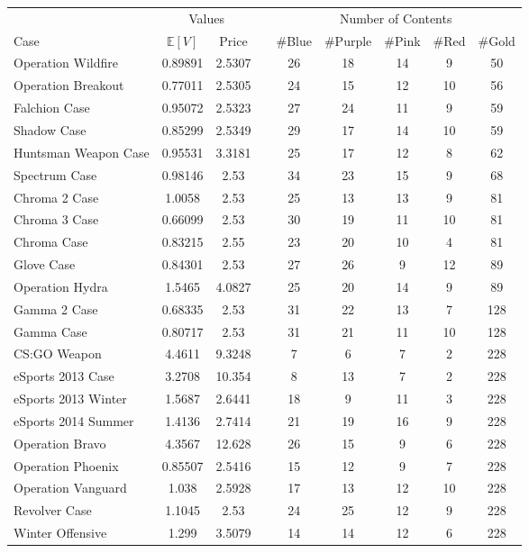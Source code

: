 \documentclass[12pt]{paper}
\begin{document}
\begin{minipage}{\linewidth}
  \centering
  \begin{tabular}{@{}lcccccccc@{}}\toprule
    & \multicolumn{2}{c}{Values} & &\multicolumn{5}{c}{Number of Contents}\\
    \cmidrule{2-3} \cmidrule{5-9}
  Case & $\mathbb{E}[V]$ & Price &\quad& \#Blue & \#Purple & \#Pink & \#Red & \#Gold\\\midrule
Operation Wildfire  & 0.89891 & 2.5307 &\quad& 26 & 18 & 14 & 9 & 50\\
Operation Breakout  & 0.77011 & 2.5305 &\quad& 24 & 15 & 12 & 10 & 56\\
Falchion Case  & 0.95072 & 2.5323 &\quad& 27 & 24 & 11 & 9 & 59\\
Shadow Case  & 0.85299 & 2.5349 &\quad& 29 & 17 & 14 & 10 & 59\\
Huntsman Weapon Case  & 0.95531 & 3.3181 &\quad& 25 & 17 & 12 & 8 & 62\\
Spectrum Case  & 0.98146 & 2.53 &\quad& 34 & 23 & 15 & 9 & 68\\
Chroma 2 Case  & 1.0058 & 2.53 &\quad& 25 & 13 & 13 & 9 & 81\\
Chroma 3 Case  & 0.66099 & 2.53 &\quad& 30 & 19 & 11 & 10 & 81\\
Chroma Case  & 0.83215 & 2.55 &\quad& 23 & 20 & 10 & 4 & 81\\
Glove Case  & 0.84301 & 2.53 &\quad& 27 & 26 & 9 & 12 & 89\\
Operation Hydra  & 1.5465 & 4.0827 &\quad& 25 & 20 & 14 & 9 & 89\\
Gamma 2 Case  & 0.68335 & 2.53 &\quad& 31 & 22 & 13 & 7 & 128\\
Gamma Case & 0.80717 & 2.53 &\quad& 31 & 21 & 11 & 10 & 128\\\hline
CS:GO Weapon  & 4.4611 & 9.3248 &\quad& 7 & 6 & 7 & 2 & 228\\
eSports 2013 Case  & 3.2708 & 10.354 &\quad& 8 & 13 & 7 & 2 & 228\\
eSports 2013 Winter  & 1.5687 & 2.6441 &\quad& 18 & 9 & 11 & 3 & 228\\
eSports 2014 Summer  & 1.4136 & 2.7414 &\quad& 21 & 19 & 16 & 9 & 228\\
Operation Bravo  & 4.3567 & 12.628 &\quad& 26 & 15 & 9 & 6 & 228\\
Operation Phoenix  & 0.85507 & 2.5416 &\quad& 15 & 12 & 9 & 7 & 228\\
Operation Vanguard  & 1.038 & 2.5928 &\quad& 17 & 13 & 12 & 10 & 228\\
Revolver Case  & 1.1045 & 2.53 &\quad& 24 & 25 & 12 & 9 & 228\\
Winter Offensive  & 1.299 & 3.5079 &\quad& 14 & 14 & 12 & 6 & 228\\\bottomrule
  \end{tabular}
  
\end{minipage}
\end{document}
